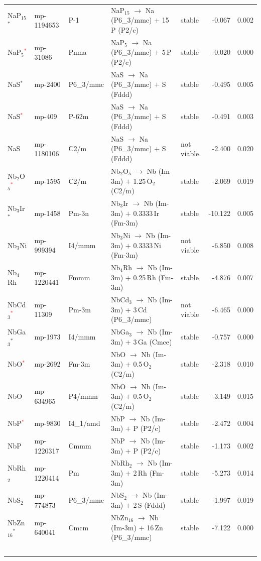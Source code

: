 \begin{longtable}{@{}ll l@{\hspace{4pt}} p{4.6cm} l@{\hspace{4pt}} rr@{}}
NaP$_{15}$$^*$ & mp-1194653 & P-1 & NaP$_{15}$ $\to$ Na (P6\_3/mmc) $+$ 15\,P (P2/c) & stable & -0.067 & 0.002 \\
NaP$_{5}$\textcolor{red}{$^*$} & mp-31086 & Pnma & NaP$_{5}$ $\to$ Na (P6\_3/mmc) $+$ 5\,P (P2/c) & stable & -0.020 & 0.000 \\
NaS$^*$ & mp-2400 & P6\_3/mmc & NaS $\to$ Na (P6\_3/mmc) $+$ S (Fddd) & stable & -0.495 & 0.005 \\
NaS\textcolor{red}{$^*$} & mp-409 & P-62m & NaS $\to$ Na (P6\_3/mmc) $+$ S (Fddd) & stable & -0.491 & 0.003 \\
NaS & mp-1180106 & C2/m & NaS $\to$ Na (P6\_3/mmc) $+$ S (Fddd) & not viable & -2.400 & 0.020 \\
Nb$_{2}$O$_{5}$\textcolor{red}{$^*$} & mp-1595 & C2/m & Nb$_{2}$O$_{5}$ $\to$ Nb (Im-3m) $+$ 1.25\,O$_{2}$ (C2/m) & stable & -2.069 & 0.019 \\
Nb$_{3}$Ir$^*$ & mp-1458 & Pm-3n & Nb$_{3}$Ir $\to$ Nb (Im-3m) $+$ 0.3333\,Ir (Fm-3m) & stable & -10.122 & 0.005 \\
Nb$_{3}$Ni & mp-999394 & I4/mmm & Nb$_{3}$Ni $\to$ Nb (Im-3m) $+$ 0.3333\,Ni (Fm-3m) & not viable & -6.850 & 0.008 \\
Nb$_{4}$Rh & mp-1220441 & Fmmm & Nb$_{4}$Rh $\to$ Nb (Im-3m) $+$ 0.25\,Rh (Fm-3m) & stable & -4.876 & 0.007 \\
NbCd$_{3}$\textcolor{red}{$^*$} & mp-11309 & Pm-3m & NbCd$_{3}$ $\to$ Nb (Im-3m) $+$ 3\,Cd (P6\_3/mmc) & not viable & -6.465 & 0.000 \\
NbGa$_{3}$$^*$ & mp-1973 & I4/mmm & NbGa$_{3}$ $\to$ Nb (Im-3m) $+$ 3\,Ga (Cmce) & stable & -0.757 & 0.000 \\
NbO\textcolor{red}{$^*$} & mp-2692 & Fm-3m & NbO $\to$ Nb (Im-3m) $+$ 0.5\,O$_{2}$ (C2/m) & stable & -2.318 & 0.010 \\
NbO & mp-634965 & P4/mmm & NbO $\to$ Nb (Im-3m) $+$ 0.5\,O$_{2}$ (C2/m) & stable & -3.149 & 0.015 \\
NbP\textcolor{red}{$^*$} & mp-9830 & I4\_1/amd & NbP $\to$ Nb (Im-3m) $+$ P (P2/c) & stable & -2.472 & 0.004 \\
NbP & mp-1220317 & Cmmm & NbP $\to$ Nb (Im-3m) $+$ P (P2/c) & stable & -1.173 & 0.002 \\
NbRh$_{2}$ & mp-1220414 & Pm & NbRh$_{2}$ $\to$ Nb (Im-3m) $+$ 2\,Rh (Fm-3m) & stable & -5.273 & 0.014 \\
NbS$_{2}$ & mp-774873 & P6\_3/mmc & NbS$_{2}$ $\to$ Nb (Im-3m) $+$ 2\,S (Fddd) & stable & -1.997 & 0.019 \\
NbZn$_{16}$$^*$ & mp-640041 & Cmcm & NbZn$_{16}$ $\to$ Nb (Im-3m) $+$ 16\,Zn (P6\_3/mmc) & stable & -7.122 & 0.000 \\
$$
\end{longtable}
